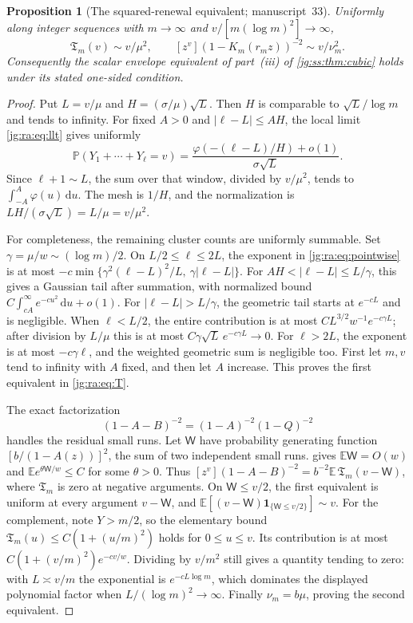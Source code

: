 \documentclass[11pt,a4paper]{article}
\newtheorem{proposition}[proposition]{Proposition}
\theoremstyle{definition}\newaliascnt{definition}{theorem}
\theoremstyle{remark}\newaliascnt{remark}{theorem}
\newcommand{\one}{\mathbf 1}
\newcommand{\dd}{\mathrm d}
\newcommand{\ljP}{\mathbb P}
\newcommand{\ljE}{\mathbb E}
\begin{document}
\begin{proposition}[The squared-renewal equivalent; manuscript~33]
\label{jg:ra:prop:renewal}
Uniformly along integer sequences with $m\to\infty$ and
$v/[m(\log m)^2]\to\infty$,
\begin{equation}\label{jg:ra:eq:T}
 \mathfrak T_m(v)\sim v/\mu^2,\qquad
 [z^v](1-K_m(r_mz))^{-2}\sim v/\nu_m^2.
\end{equation}
Consequently the scalar envelope equivalent of part~(iii) of
\cref{jg:ss:thm:cubic} holds under its stated one-sided condition.
\end{proposition}
\begin{proof}
Put $L=v/\mu$ and $H=(\sigma/\mu)\sqrt L$. Then $H$ is comparable to
$\sqrt L/\log m$ and tends to infinity. For fixed $A>0$ and $|\ell-L|\le AH$,
the local limit \eqref{jg:ra:eq:llt} gives uniformly
\[
 \ljP(Y_1+\cdots+Y_\ell=v)
 =\frac{\varphi(-(\ell-L)/H)+o(1)}{\sigma\sqrt L}.
\]
Since $\ell+1\sim L$, the sum over that window, divided by $v/\mu^2$, tends to
$\int_{-A}^{A}\varphi(u)\,\dd u$. The mesh is $1/H$, and the normalization is
$LH/(\sigma\sqrt L)=L/\mu=v/\mu^2$.

For completeness, the remaining cluster counts are uniformly summable. Set
$\gamma=\mu/w\sim(\log m)/2$. On $L/2\le\ell\le2L$, the exponent in
\eqref{jg:ra:eq:pointwise} is at most
$-c\min\{\gamma^2(\ell-L)^2/L,\ \gamma|\ell-L|\}$. For
$AH<|\ell-L|\le L/\gamma$, this gives a Gaussian tail after summation, with
normalized bound $C\int_{cA}^\infty e^{-cu^2}\,\dd u+o(1)$. For
$|\ell-L|>L/\gamma$, the geometric tail starts at $e^{-cL}$ and is negligible.
When $\ell<L/2$, the entire contribution is at most
$CL^{3/2}w^{-1}e^{-c\gamma L}$; after division by $L/\mu$ this is at most
$C\gamma\sqrt L\,e^{-c\gamma L}\to0$. For $\ell>2L$, the exponent is at most
$-c\gamma\ell$, and the weighted geometric sum is negligible too. First let
$m,v$ tend to infinity with $A$ fixed, and then let $A$ increase. This proves
the first equivalent in \eqref{jg:ra:eq:T}.

The exact factorization
\begin{equation}\label{jg:ra:eq:square}
 (1-A-B)^{-2}=(1-A)^{-2}(1-Q)^{-2}
\end{equation}
handles the residual small runs. Let $\mathsf W$ have probability generating
function $[b/(1-A(z))]^2$, the sum of two independent small runs.
 gives $\ljE\mathsf W=O(w)$ and
$\ljE e^{\theta\mathsf W/w}\le C$ for some $\theta>0$. Thus
$[z^v](1-A-B)^{-2}=b^{-2}\ljE\,\mathfrak T_m(v-\mathsf W)$, where
$\mathfrak T_m$ is zero at negative arguments. On $\mathsf W\le v/2$, the first
equivalent is uniform at every argument $v-\mathsf W$, and
$\ljE[(v-\mathsf W)\one_{\{\mathsf W\le v/2\}}]\sim v$. For the complement,
note $Y>m/2$, so the elementary bound $\mathfrak T_m(u)\le C(1+(u/m)^2)$ holds
for $0\le u\le v$. Its contribution is at most $C(1+(v/m)^2)e^{-cv/w}$.
Dividing by $v/m^2$ still gives a quantity tending to zero: with $L\asymp v/m$
the exponential is $e^{-cL\log m}$, which dominates the displayed polynomial
factor when $L/(\log m)^2\to\infty$. Finally $\nu_m=b\mu$, proving the second
equivalent.


\end{proof}
\end{document}
